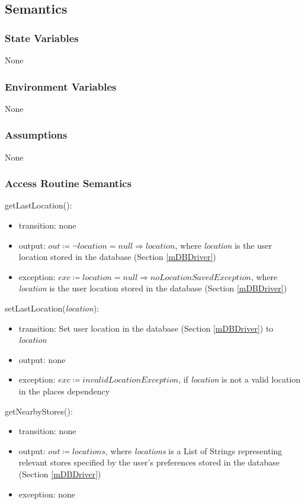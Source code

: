 \documentclass[12pt, titlepage]{article}
\begin{document}
\subsection{Semantics}

\subsubsection{State Variables}
None

\subsubsection{Environment Variables}
None

\subsubsection{Assumptions}
None

\subsubsection{Access Routine Semantics}

\noindent getLastLocation():
\begin{itemize}
\item transition: none
\item output: \( \textit{out} \coloneqq \neg location = null \Rightarrow  location \), where \textit{location} is the user location stored in the database (Section \ref{mDBDriver})
\item exception: \( \textit{exc} \coloneqq location = null \Rightarrow  noLocationSavedException \), where \textit{location} is the user location stored in the database (Section \ref{mDBDriver})
\end{itemize}

\noindent setLastLocation(\textit{location}):
\begin{itemize}
\item transition: Set user location in the database (Section \ref{mDBDriver}) to \textit{location}
\item output: none
\item exception: \( \textit{exc} \coloneqq invalidLocationException \), if \textit{location} is not a valid location in the places dependency
\end{itemize}

\noindent getNearbyStores():
\begin{itemize}
\item transition: none
\item output: \( \textit{out} \coloneqq locations \), where \textit{locations} is a List of Strings representing relevant stores specified by the user's preferences stored in the database (Section \ref{mDBDriver})
\item exception: none
\end{itemize}
\end{document}
